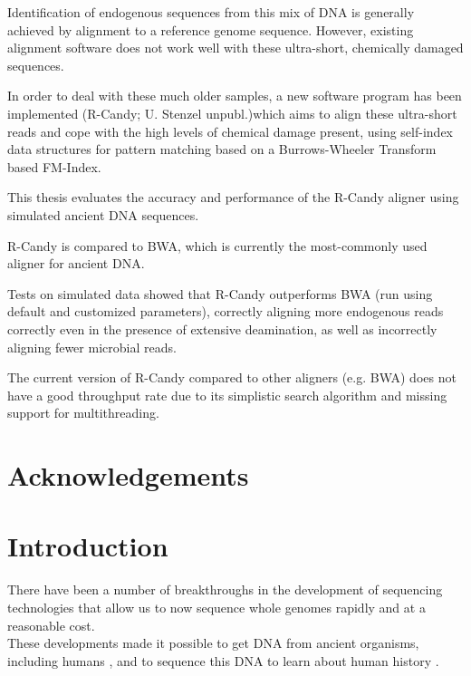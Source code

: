 \documentclass[11pt,a4paper]{report}
\begin{document}
Identification of endogenous sequences from this mix of DNA is generally achieved by
alignment to a reference genome sequence. 
However, existing alignment software does not work well with these ultra-short, 
chemically damaged sequences.

In order to deal with these much older samples, a new software program has been implemented
(R-Candy; U. Stenzel unpubl.)which aims to align these ultra-short reads and cope with the high 
levels of chemical damage present, using self-index data structures for pattern matching
based on a Burrows-Wheeler Transform based FM-Index.


This thesis evaluates the accuracy and performance of the R-Candy aligner using 
simulated ancient DNA sequences. 

R-Candy is compared to BWA, which is currently the most-commonly used aligner for ancient DNA.

Tests on simulated data showed that R-Candy outperforms BWA (run using default 
and customized parameters), correctly aligning more endogenous reads correctly even
in the presence of extensive deamination, as well as incorrectly aligning fewer
microbial reads.

The current version of R-Candy compared to other aligners (e.g. BWA) does not have a good 
throughput rate due to its simplistic search algorithm and missing
support for multithreading.

\newpage\null\thispagestyle{empty}\newpage
\section*{Acknowledgements}
\newpage\null\thispagestyle{empty}\newpage

\tableofcontents
\newpage
\listoftables
\newpage
\listoffigures
\newpage




\section{Introduction} \label{Introduction}


There have been a number of breakthroughs in the development of sequencing 
technologies that allow us to now sequence whole genomes rapidly and at a 
reasonable cost\cite{NGS}\cite{454}\cite{NGS2}.
\\
These developments made it possible to get DNA from ancient organisms, 
including humans \cite{AncientDNA}\cite{fish2human}, and to sequence 
this DNA to learn about human history\cite{impactOFhg}\cite{ourGenome}
\cite{SNP}.
\end{document}
